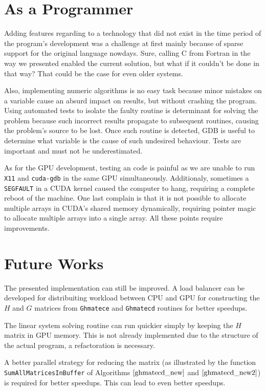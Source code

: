 \section{As a Programmer}

Adding features regarding to a technology that did not exist in the time period of the program's 
development was a challenge at first mainly because of sparse support for the original language nowdays. 
Sure, calling C from Fortran in the way we presented enabled the current solution, 
but what if it couldn't be done in that way? That could be the case for even older systems.

Also, implementing numeric algorithms is no easy task because minor mistakes on a variable cause an 
absurd impact on results, but without crashing the program. Using automated tests to isolate the 
faulty routine is determinant for solving the problem because such incorrect results propagate to 
subsequent routines, causing the problem's source to be lost. Once such routine is detected, GDB 
is useful to determine what variable is the cause of such undesired behaviour. Tests are important 
and must not be underestimated.

As for the GPU development, testing an code is painful as we are unable to run \texttt{X11} and \texttt{cuda-gdb} 
in the same GPU  simultaneously. Additionaly, sometimes a \texttt{SEGFAULT} in a CUDA kernel caused the computer 
to hang, requiring a complete reboot of the machine. 
One last complain is that it is not possible to allocate multiple arrays in CUDA's shared memory dynamically, 
requiring pointer magic to allocate multiple arrays into a single array. All these points require improvements. 

\section{Future Works}

The presented implementation can still be improved. A load balancer can be developed for 
distribuiting workload between CPU and GPU for constructing the $H$ and $G$ matrices from 
\texttt{Ghmatece} and \texttt{Ghmatecd} routines for better speedups.  

The linear system solving routine can run quickier simply by keeping the $H$ 
matrix in GPU memory. This is not already implemented due to the structure of the actual 
program, a refactoration is necessary.

A better parallel strategy for reducing the matrix (as illustrated by the function 
\texttt{SumAllMatricesInBuffer} of Algorithms $\ref{ghmatecd_new}$ and $\ref{ghmatecd_new2}$) is 
required for better speedups. This can lead to even better speedups.
